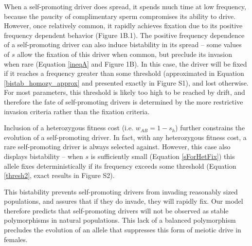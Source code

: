 \documentclass{pnastwo}
\begin{document}
\begin{article}
When a self-promoting driver does spread, 
	it spends much time at low frequency, 
	because the paucity of complimentary sperm compromises its ability to drive. 
However, once relatively common, it  rapidly achieves fixation due to its
	positive frequency dependent behavior (Figure 1B.1).  
The positive frequency dependence of a self-promoting driver can also
	induce bistability in its spread -- some values of $s$ 
	allow the fixation of this driver when common, but 
	preclude its invasion when rare (Equation \ref{ineqA} and Figure 1B). 
In this case, the driver will be fixed if it reaches a frequency greater than some threshold 
	(approximated in Equation \ref{bistab_homozy_approx} and  presented exactly in 
	Figure S1), and lost otherwise. 
For most parameters, this threshold is likely too high to be reached by drift, 
	and therefore  the fate of self-promoting drivers is determined
	by the more restrictive invasion criteria rather than the fixation criteria. 

Inclusion of a heterozygous fitness cost (i.e. $w_{AB}=1-s_h$)
	further constrains the evolution of a self-promoting driver. 
In fact, with any heterozygous fitness cost, a rare self-promoting
	driver is always selected against. 
However, this case also displays bistability -- 
	when $s$ is sufficiently small (Equation \ref{sForHetFix}) this allele fixes deterministically if its 
	frequency exceeds some threshold  (Equation \ref{thresh2}, exact results in 
	Figure S2).

This bistability prevents self-promoting drivers from invading 	
	reasonably sized populations, and assures that if they do invade, they will rapidly fix.
Our model therefore predicts that self-promoting drivers will not be
	observed as stable polymorphisms in natural populations. 
This lack of a balanced polymorphism
	precludes the evolution of an
	allele that suppresses this form of meiotic drive in females.


\end{article}
\end{document}
